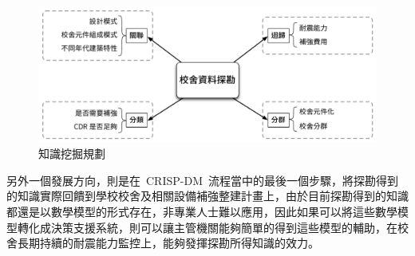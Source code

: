 
\begin{figure}[hbtp]
  \begin{center}
    \includegraphics[width=1.0\textwidth]{figures/big-picture.pdf}
    \caption{知識挖掘規劃} 
    \label{fig:bigpicture}
  \end{center}
\end{figure}

另外一個發展方向，則是在~CRISP-DM~流程當中的最後一個步驟，將探勘得到的知識實際回饋到學校校舍及相關設備補強整建計畫上，由於目前探勘得到的知識都還是以數學模型的形式存在，非專業人士難以應用，因此如果可以將這些數學模型轉化成決策支援系統，則可以讓主管機關能夠簡單的得到這些模型的輔助，在校舍長期持續的耐震能力監控上，能夠發揮探勘所得知識的效力。


